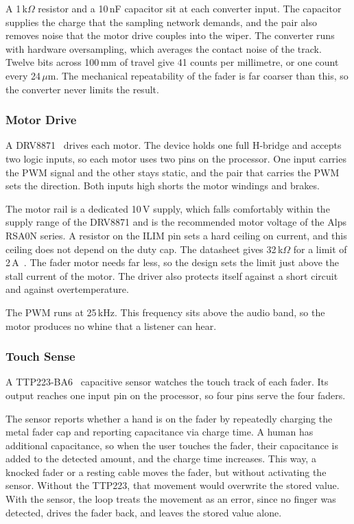 \documentclass[11pt, letterpaper,titlepage]{article}
\begin{document}
A 1\,k$\Omega$ resistor and a 10\,nF capacitor sit at each converter input. The
capacitor supplies the charge that the sampling network demands, and the pair
also removes noise that the motor drive couples into the wiper. The converter
runs with hardware oversampling, which averages the contact noise of the track.
Twelve bits across 100\,mm of travel give 41 counts per millimetre, or one count
every 24\,$\mu$m. The mechanical repeatability of the fader is far coarser than
this, so the converter never limits the result.

\subsubsection*{Motor Drive}
\label{sssec:fader-motor}

A DRV8871~\cite{drv8871} drives each motor. The device holds one full H-bridge and accepts two
logic inputs, so each motor uses two pins on the processor. One input carries
the PWM signal and the other stays static, and the pair that carries the PWM
sets the direction. Both inputs high shorts the motor windings and brakes.

The motor rail is a dedicated 10\,V supply, which falls comfortably within the supply range of the DRV8871 and is the recommended motor voltage of the Alps RSA0N series. A resistor on the ILIM pin sets a hard ceiling on current, and this ceiling does
not depend on the duty cap. The datasheet gives 32\,k$\Omega$ for a limit of
2\,A~\cite{drv8871}. The fader motor needs far less, so the design sets the limit just above
the stall current of the motor. The driver also protects itself against a short
circuit and against overtemperature.

The PWM runs at 25\,kHz. This frequency sits above the audio band, so the motor produces no whine that a listener can hear.

\subsubsection*{Touch Sense}
\label{sssec:fader-touch}

A TTP223-BA6~\cite{ttp223} capacitive sensor watches the touch track of each fader. Its output
reaches one input pin on the processor, so four pins serve the four faders.

The sensor reports whether a hand is on the fader by repeatedly charging the metal fader cap and reporting capacitance via charge time. A human has additional capacitance, so when the user touches the fader, their capacitance is added to the detected amount, and the charge time increases. This way, a
knocked fader or a resting cable moves the fader, but without activating the sensor. Without the TTP223, that movement would overwrite the stored value. With
the sensor, the loop treats the movement as an error, since no finger was detected, drives the fader back, and
leaves the stored value alone.
\end{document}
